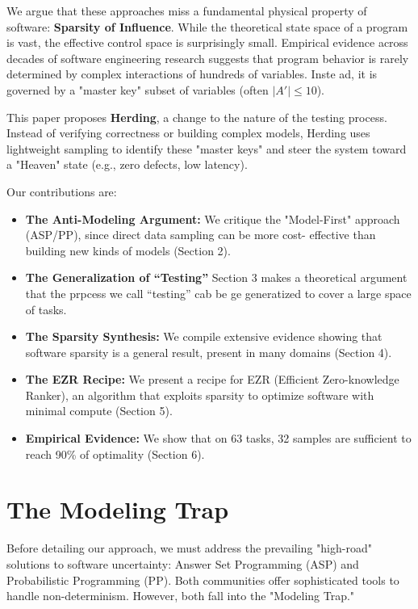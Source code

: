 \documentclass[runningheads]{llncs}
\begin{document}
We argue that these approaches miss a fundamental physical property of 
software: \textbf{Sparsity of Influence}. While the theoretical state space of 
a program is vast, the effective control space is surprisingly small. 
Empirical evidence across decades of software engineering research suggests 
that program behavior is rarely determined by complex interactions of hundreds 
of variables. Inste ad, it is governed by a "master key" subset of variables 
(often $|A'| \le 10$).

This paper proposes \textbf{Herding}, a change to the nature of the testing 
process. Instead of verifying correctness or building complex  models, 
Herding uses lightweight sampling to identify these "master keys" and steer 
the system toward a "Heaven" state (e.g., zero defects, low latency).

Our contributions are:
\begin{itemize}
    \item \textbf{The Anti-Modeling Argument:} We critique the "Model-First" 
    approach (ASP/PP), since  direct data sampling can be more cost-
    effective than building new kinds of models (Section 2).
        \item \textbf{The Generalization
        of ``Testing'' }  Section 3 makes a theoretical argument that the prpcess we call ``testing'' cab be ge generatized to cover a large space of tasks. 
    \item \textbf{The Sparsity Synthesis:} We compile extensive evidence 
    showing that software sparsity is a general result, present in many domains  (Section 4).
    \item \textbf{The EZR Recipe:} We present a 
    recipe for EZR (Efficient Zero-knowledge Ranker), an algorithm that 
    exploits sparsity to optimize software with minimal compute (Section 5).
    \item \textbf{Empirical Evidence:} We show that on 63 tasks, 32 samples are 
    sufficient to reach 90\% of  optimality (Section 6).
\end{itemize}

\section{The Modeling Trap }
Before detailing our approach, we must address the prevailing "high-road" 
solutions to software uncertainty: Answer Set Programming (ASP) and 
Probabilistic Programming (PP). Both communities offer sophisticated tools 
to handle non-determinism. However, both fall into the "Modeling Trap."
\end{document}
